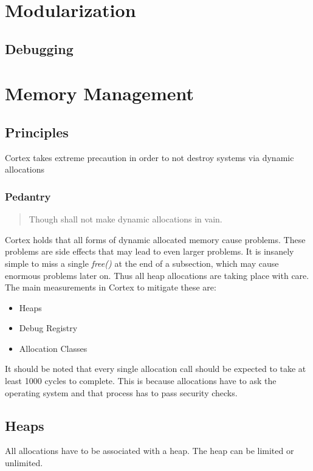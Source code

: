 \documentclass{report}
\begin{document}
\chapter{Modularization}

\section{Debugging}

\chapter{Memory Management}

\section{Principles}
Cortex takes extreme precaution in order to not destroy systems via dynamic allocations

\subsection{Pedantry}

\begin{quote}
    Though shall not make dynamic allocations in vain.
\end{quote}
Cortex holds that all forms of dynamic allocated memory cause problems. 
These problems are side effects that may lead to even larger problems. 
It is insanely simple to miss a single \textit{free()} at the end of a subsection, which may cause enormous problems later on.
Thus all heap allocations are taking place with care. 
The main measurements in Cortex to mitigate these are:
\begin{itemize}
    \item Heaps
    \item Debug Registry
    \item Allocation Classes
\end{itemize}
It should be noted that every single allocation call should be expected to take at least 1000 cycles to complete.
This is because allocations have to ask the operating system and that process has to pass security checks.

\section{Heaps}
All allocations have to be associated with a heap. The heap can be limited or unlimited.
\end{document}

